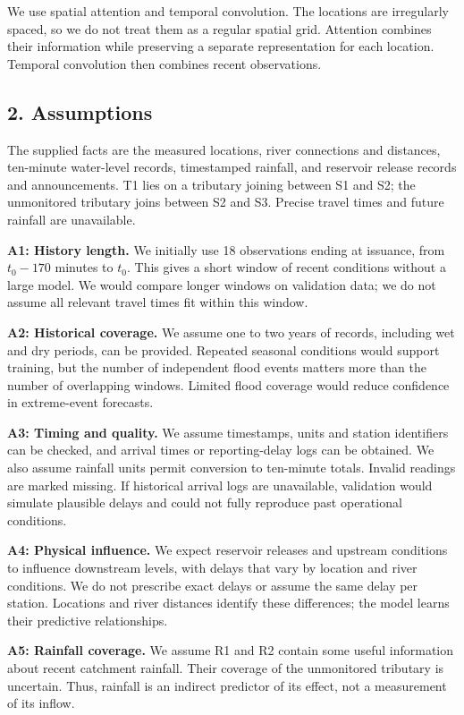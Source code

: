 We use spatial attention and temporal convolution. The locations are irregularly spaced, so we do not treat them as a regular spatial grid. Attention combines their information while preserving a separate representation for each location. Temporal convolution then combines recent observations.

\clearpage
\subsection*{2. Assumptions}
The supplied facts are the measured locations, river connections and distances, ten-minute water-level records, timestamped rainfall, and reservoir release records and announcements. T1 lies on a tributary joining between S1 and S2; the unmonitored tributary joins between S2 and S3. Precise travel times and future rainfall are unavailable.

\textbf{A1: History length.} We initially use 18 observations ending at issuance, from $t_0-170$ minutes to $t_0$. This gives a short window of recent conditions without a large model. We would compare longer windows on validation data; we do not assume all relevant travel times fit within this window.

\textbf{A2: Historical coverage.} We assume one to two years of records, including wet and dry periods, can be provided. Repeated seasonal conditions would support training, but the number of independent flood events matters more than the number of overlapping windows. Limited flood coverage would reduce confidence in extreme-event forecasts.

\textbf{A3: Timing and quality.} We assume timestamps, units and station identifiers can be checked, and arrival times or reporting-delay logs can be obtained. We also assume rainfall units permit conversion to ten-minute totals. Invalid readings are marked missing. If historical arrival logs are unavailable, validation would simulate plausible delays and could not fully reproduce past operational conditions.

\textbf{A4: Physical influence.} We expect reservoir releases and upstream conditions to influence downstream levels, with delays that vary by location and river conditions. We do not prescribe exact delays or assume the same delay per station. Locations and river distances identify these differences; the model learns their predictive relationships.

\textbf{A5: Rainfall coverage.} We assume R1 and R2 contain some useful information about recent catchment rainfall. Their coverage of the unmonitored tributary is uncertain. Thus, rainfall is an indirect predictor of its effect, not a measurement of its inflow.

